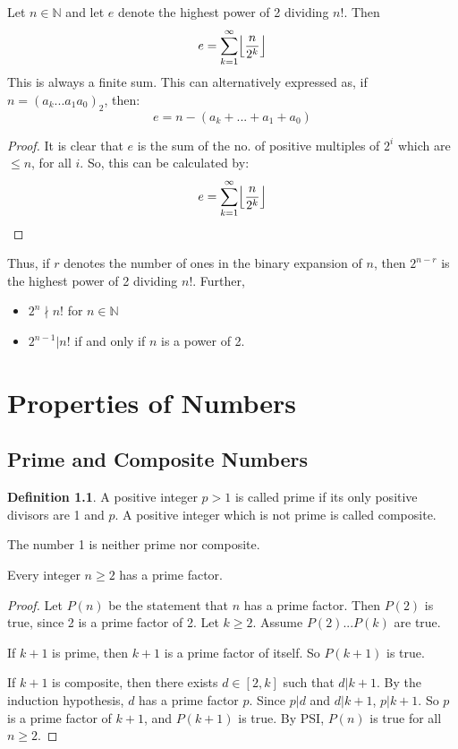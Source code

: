 \documentclass[12pt,letterpaper]{amsbook}
\theoremstyle{definition}
\newtheorem{definition}{Definition} %
\newcommand{\N}{\mathbb{N}}
\begin{document}
\begin{lemma}
  Let $n \in \N$ and let $e$ denote the highest power of 2 dividing $n!$. Then
  \[e = \sum_{k=1}^{\infty} \Bigl \lfloor \frac{n}{2^k} \Bigr \rfloor\]
  This is always a finite sum. This can alternatively expressed as, if $n = (a_k...a_1a_0)_2$, then:
  \[e = n - (a_k + ... + a_1 + a_0)\]
\end{lemma}
\begin{proof}
  It is clear that $e$ is the sum of the no. of positive multiples of $2^i$ which are $\leq n$, for all $i$. So, this can be calculated by:
  \begin{align*}
    e = \sum_{k=1}^{\infty} \Bigl \lfloor \frac{n}{2^k} \Bigr \rfloor    
  \end{align*}
\end{proof}

Thus, if $r$ denotes the number of ones in the binary expansion of $n$, then $2^{n-r}$ is the highest power of 2 dividing $n!$. Further,
\begin{itemize}
  \item $2^n \nmid n!$ for $n \in \N$
  \item $2^{n-1} | n!$ if and only if $n$ is a power of 2.
\end{itemize}

\chapter{Properties of Numbers}

\section{Prime and Composite Numbers}

\begin{definition}
  A positive integer $p > 1$ is called prime if its only positive divisors are 1 and $p$. A positive integer which is not prime is called composite.  
\end{definition}

The number 1 is neither prime nor composite.

\begin{lemma}
  Every integer $n \geq 2$ has a prime factor.
\end{lemma}

\begin{proof}
  Let $P(n)$ be the statement that $n$ has a prime factor. Then $P(2)$ is true, since 2 is a prime factor of 2. Let $k \geq 2$. Assume $P(2)...P(k)$ are true.

  If $k+1$ is prime, then $k+1$ is a prime factor of itself. So $P(k+1)$ is true.

  If $k+1$ is composite, then there exists $d \in [2,k]$ such that $d | k+1$. By the induction hypothesis, $d$ has a prime factor $p$. Since $p|d$ and $d|k+1$, $p|k+1$. So $p$ is a prime factor of $k+1$, and $P(k+1)$ is true. By PSI, $P(n)$ is true for all $n \geq 2$.
\end{proof}
\end{document}
